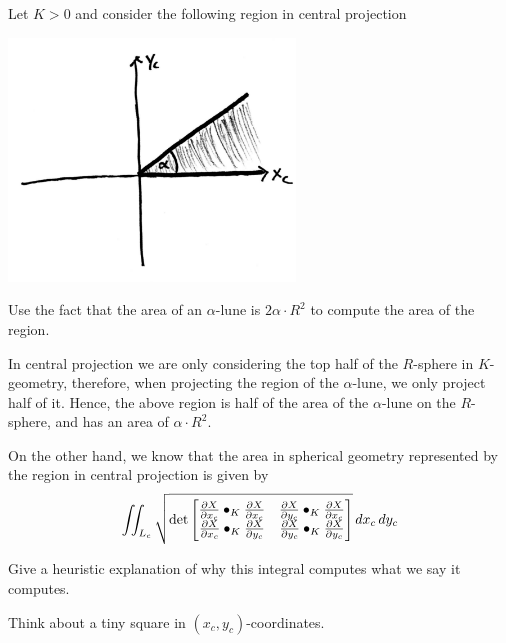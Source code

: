\documentclass[newpage,hints,handout]{ximera}
\begin{document}
\begin{problem}
  Let $K>0$ and consider the following region in central projection
 \begin{image}
   \includegraphics[width=3in]{halfLune.png}
 \end{image}
 Use the fact that the area of an $\alpha$-lune is $2\alpha\cdot R^2$
 to compute the area of the region.
 \begin{freeResponse}
In central projection we are only considering the top half of the $R$-sphere in $K$-geometry, therefore, when projecting the region of the $\alpha$-lune, we only project half of it. Hence, the above region is half of the area of the $\alpha$-lune on the $R$-sphere, and has an area of $\alpha \cdot R^{2}$.
 \end{freeResponse}
\end{problem}

On the other hand, we know that the area in spherical geometry
represented by the region in central projection is given by
\[
\iint_{L_c} \sqrt{
  \det
  \begin{bmatrix}
    \pp[X]{x_c}\bullet_K \pp[X]{x_c} & \pp[X]{y_c}\bullet_K \pp[X]{x_c} \\
    \pp[X]{x_c}\bullet_K \pp[X]{y_c} & \pp[X]{y_c}\bullet_K \pp[X]{y_c}
  \end{bmatrix}
}\d x_c\d y_c
\]

\begin{problem}
  Give a heuristic explanation of why this integral computes what we
  say it computes.
  \begin{hint}
    Think about a tiny square in $(x_c,y_c)$-coordinates.
  \end{hint}
\end{problem}
\end{document}
